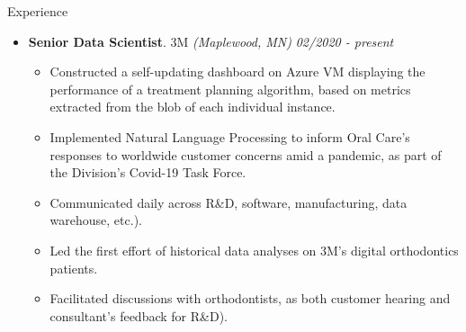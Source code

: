 \documentclass{resume} %
\begin{document}
	
	\begin{rSection}{Experience}
		
		\begin{itemize}[leftmargin=0em]
			
			\item {\bf Senior Data Scientist}{. 3M \textit{(Maplewood, MN)}} \hfill {\em 02/2020 - present}\\
			\vspace{-5mm}
			\begin{itemize}
				\setlength\itemsep{-1.75em}			
				\item Constructed a self-updating dashboard on Azure VM displaying the performance of a treatment planning algorithm, based on metrics extracted from the blob of each individual instance.\\
				\item Implemented Natural Language Processing to inform Oral Care's responses to worldwide customer concerns amid a pandemic, as part of the Division's Covid-19 Task Force.\\
				\item Communicated daily across R\&D, software, manufacturing, data warehouse, etc.).\\
				\item Led the first effort of historical data analyses on 3M's digital orthodontics patients.\\
				\item Facilitated discussions with orthodontists, as both customer hearing and consultant's feedback for R\&D).
			\end{itemize}	
		

\end{itemize}
\end{rSection}
\end{document}
